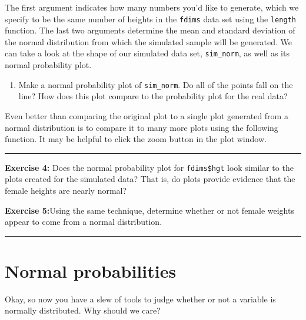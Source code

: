 \documentclass[]{book}
\newenvironment{Shaded}{\begin{snugshade}}{\end{snugshade}}
\newcommand{\KeywordTok}[1]{\textcolor[rgb]{0.13,0.29,0.53}{\textbf{{#1}}}}
\newcommand{\NormalTok}[1]{{#1}}
\providecommand{\tightlist}{%
  \setlength{\itemsep}{0pt}\setlength{\parskip}{0pt}}
\theoremstyle{definition}
\theoremstyle{definition}
\theoremstyle{definition}
\theoremstyle{remark}
\begin{document}
The first argument indicates how many numbers you'd like to generate,
which we specify to be the same number of heights in the \texttt{fdims}
data set using the \texttt{length} function. The last two arguments
determine the mean and standard deviation of the normal distribution
from which the simulated sample will be generated. We can take a look at
the shape of our simulated data set, \texttt{sim\_norm}, as well as its
normal probability plot.

\begin{enumerate}
\def\labelenumi{\arabic{enumi}.}
\setcounter{enumi}{2}
\tightlist
\item
  Make a normal probability plot of \texttt{sim\_norm}. Do all of the
  points fall on the line? How does this plot compare to the probability
  plot for the real data?
\end{enumerate}

Even better than comparing the original plot to a single plot generated
from a normal distribution is to compare it to many more plots using the
following function. It may be helpful to click the zoom button in the
plot window.

\begin{Shaded}
\end{Shaded}

\begin{center}\rule{0.5\linewidth}{\linethickness}\end{center}

\textbf{Exercise 4:} Does the normal probability plot for
\texttt{fdims\$hgt} look similar to the plots created for the simulated
data? That is, do plots provide evidence that the female heights are
nearly normal?

\textbf{Exercise 5:}Using the same technique, determine whether or not
female weights appear to come from a normal distribution.

\begin{center}\rule{0.5\linewidth}{\linethickness}\end{center}

\section{Normal probabilities}\label{normal-probabilities}

Okay, so now you have a slew of tools to judge whether or not a variable
is normally distributed. Why should we care?
\end{document}
